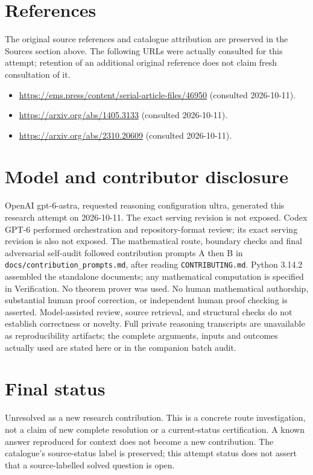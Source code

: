 \documentclass[11pt]{article}
\begin{document}
\section{References}
The original source references and catalogue attribution are preserved in the
Sources section above. The following URLs were actually consulted for this attempt;
retention of an additional original reference does not claim fresh consultation of it.
\begin{itemize}
\item \url{https://ems.press/content/serial-article-files/46950} (consulted 2026-10-11). 
\item \url{https://arxiv.org/abs/1405.3133} (consulted 2026-10-11). 
\item \url{https://arxiv.org/abs/2310.20609} (consulted 2026-10-11). 
\end{itemize}
\section{Model and contributor disclosure}
OpenAI gpt-6-astra, requested reasoning configuration ultra, generated this research
attempt on 2026-10-11. The exact serving revision is not exposed. Codex GPT-6
performed orchestration and repository-format review; its exact serving revision
is also not exposed. The mathematical route, boundary checks and final adversarial
self-audit followed contribution prompts A then B in
\texttt{docs/contribution\_prompts.md}, after reading \texttt{CONTRIBUTING.md}.
Python 3.14.2 assembled the standalone documents; any mathematical computation is
specified in Verification. No theorem prover was used. No human mathematical
authorship, substantial human proof correction, or independent human proof checking
is asserted. Model-assisted review, source retrieval, and structural checks do not
establish correctness or novelty. Full private reasoning transcripts are unavailable
as reproducibility artifacts; the complete arguments, inputs and outcomes actually
used are stated here or in the companion batch audit.
\section{Final status}
Unresolved as a new research contribution. This is a concrete route investigation,
not a claim of new complete resolution or a current-status certification. A known
answer reproduced for context does not become a new contribution. The catalogue's
source-status label is preserved; this attempt status does not assert that a
source-labelled solved question is open.
\end{document}
